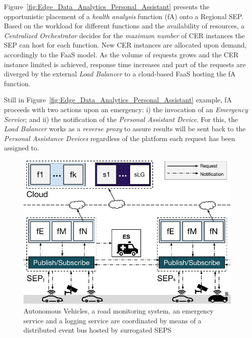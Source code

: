 Figure~\ref{fig:Edge_Data_Analytics_Personal_Assistant} presents the opportunistic placement of a \textit{health analysis} function (fA) onto a Regional SEP. Based on the workload for different functions and the availability of resources, a \textit{Centralized Orchestrator} decides for the \textit{maximum number} of CER instances the SEP can host for each function.
New CER instances are allocated upon demand, accordingly to the FaaS model. As the volume of requests grows and the CER instance limited is achieved, response time increases and part of the requests are diverged
by the external \textit{Load Balancer} to a cloud-based FaaS hosting the fA function.

Still in Figure~\ref{fig:Edge_Data_Analytics_Personal_Assistant} example, 
fA proceeds with two actions upon an emergency: i) the invocation of an 
\textit{Emergency Service}; and ii) the notification of the \textit{Personal Assistant Device}. For this, the \textit{Load Balancer} works as a \textit{reverse proxy} to assure results will be sent back to the \textit{Personal Assistance Devices} regardless of the platform each request has been assigned to.


\begin{figure}[tbp]
	\centering
	\includegraphics[width=1\linewidth]{Figs/Edge_Coordination_AVs_wide.pdf}
	\caption{Autonomous Vehicles, a road monitoring system, an emergency service and a logging service are coordinated by means of a distributed event bus hosted by surrogated SEPS}
	\label{fig:Edge_Coordination_AVs}
\end{figure}


